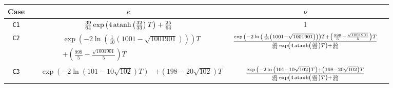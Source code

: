     \begin{table}
	\begin{tabular}{c c c c}
	\rowcolor{cb3}
	Case & $\kappa$ & $\nu$ \\
	\hline 
	\rowcolor{white} 
		\texttt{C1} & \scriptsize $ \frac {39}{64} \exp \left(4 \space \operatorname{atanh} \left(\frac{32}{33}\right) T \right) + \frac{25}{64}$ & \scriptsize 1 \\
	\rowcolor{cb1}
		\texttt{C2} & 
		\tiny $ \begin{aligned}
			&\exp{\left(-2\ln{\left( \frac{1}{10} \left( 1001 - \sqrt{1001901} \right) \right)} \right) {T}} \\
			&+ \left( \frac{999}{5}-\frac{\sqrt{1001901}}{5} \right) {T}
		\end{aligned}
		$
		& \scriptsize $  \frac{\exp{\left(-2\ln{\left( \frac{1}{10} \left( 1001 - \sqrt{1001901} \right) \right)} \right) {T}} + \left( \frac{999}{5}-\frac{\sqrt{1001901}}{5} \right) {T}
}{\frac{39}{64} \exp \left(4 \space \operatorname{atanh} \left(\frac{32}{33} \right) T \right) + \frac{25}{64}}$ \\
	\rowcolor{white}

		\texttt{C3}& \tiny $\begin{aligned}
			&\exp{\left(-2\ln{\left( 101-10\sqrt{102}\right)} {T} \right)} 
			&+ \left( 198 - 20 \sqrt{102} \right) {T}
		\end{aligned}$ & \scriptsize $\frac{\exp{\left(-2\ln{\left( 101-10\sqrt{102}\right)} {T} \right)} + \left( 198 - 20 \sqrt{102} \right) {T}}{\frac{39}{64} \exp \left(4 \space \operatorname{atanh} \left(\frac{32}{33} \right) T \right) + \frac{25}{64}}$ \\

	\hline
	\end{tabular}
    \end{table}
